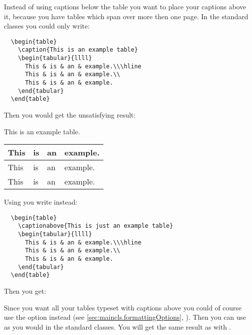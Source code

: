 \begin{Example}
  Instead of using captions below the table you want to place your
  captions above it, because you have tables
  which span over more then one page. In the standard classes you
  could only write:
\begin{lstlisting}
  \begin{table}
    \caption{This is an example table}
    \begin{tabular}{llll}
      This & is & an & example.\\\hline
      This & is & an & example.\\
      This & is & an & example.
    \end{tabular}
  \end{table}
\end{lstlisting}
  Then you would get the unsatisfying result:
  \begin{ShowOutput}\centering
    {
      This is an example table.}\\
        \begin{tabular}{llll}
      This & is & an & example.\\\hline
      This & is & an & example.\\
      This & is & an & example.
        \end{tabular}
\end{ShowOutput}
  Using \KOMAScript{} you write instead:
\begin{lstlisting}
  \begin{table}
    \captionabove{This is just an example table}
    \begin{tabular}{llll}
      This & is & an & example.\\\hline
      This & is & an & example.\\
      This & is & an & example.
    \end{tabular}
  \end{table}
\end{lstlisting}
  Then you get:
  Since you want all your tables typeset with captions above you could
  of course use the option  instead (see
  \autoref{sec:maincls.formattingOptions},
  ). Then you can use
   as you would in the standard classes. You will get
  the same result as with .
\end{Example}

